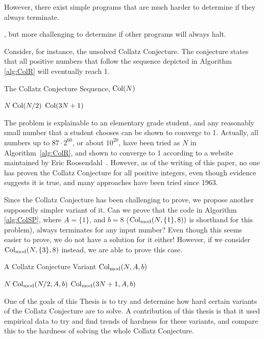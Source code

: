 However, there exist simple programs that are much harder to determine if they always terminate.


, but more challenging to determine if other programs will always halt.\par
Consider, for instance, the unsolved Collatz Conjecture. The conjecture states that all positive numbers that follow the sequence depicted in Algorithm \ref{alg:ColR} will eventually reach 1.
\begin{algorithm} 
\caption{The Collatz Conjecture Sequence, $\mathrm{Col}(N)$}
\label{alg:ColR} 
\begin{algorithmic}[1]
     \Return $N$ 
    \EndIf
     \Return $\mathrm{Col}(N/2)$
    \EndIf
    \State \Return $\mathrm{Col}(3N + 1)$ 
\end{algorithmic}
\end{algorithm}
The problem is explainable to an elementary grade student, and any reasonably small number that a student chooses can be shown to converge to 1. Actually, all numbers up to $87 \cdot 2^{60}$, or about $10^{20}$, have been tried as $N$ in Algorithm~\ref{alg:ColR}, and shown to converge to 1 according to a website maintained by Eric Roosendahl~\cite{EricRoose}. However, as of the writing of this paper, no one has proven the Collatz Conjecture for all positive integers, even though evidence suggests it is true, and many approaches have been tried since 1963.~\cite{2003mathLagrais}~\cite{2006mathLagrias}\par
Since the Collatz Conjecture has been challenging to prove, we propose another supposedly simpler variant of it. Can we prove that the code in Algorithm \ref{alg:ColSP}, where $A = \{1\}$, and $b = 8$ ($\mathrm{Col}_{\text{mod}}(N,\{1\},8))$ is shorthand for this problem), always terminates for any input number? Even though this seems easier to prove, we do not have a solution for it either! However, if we consider $\mathrm{Col}_{\text{mod}}(N,\{3\},8)$ instead, we are able to prove this case. 
\begin{algorithm} 
\caption{A Collatz Conjecture Variant $\mathrm{Col}_{\text{mod}}(N,A,b)$}
\label{alg:ColSP} 
\begin{algorithmic}[1]
     \Return $N$
    \EndIf
     \Return $\mathrm{Col}_{\text{mod}}(N/2,A,b)$
    \EndIf
    \State \Return $\mathrm{Col}_{\text{mod}}(3N+1,A,b)$ 
\end{algorithmic}
\end{algorithm}
One of the goals of this Thesis is to try and determine how hard certain variants of the Collatz Conjecture are to solve. A contribution of this thesis is that it used empirical data to try and find trends of hardness for these variants, and compare this to the hardness of solving the whole Collatz Conjecture. \par
